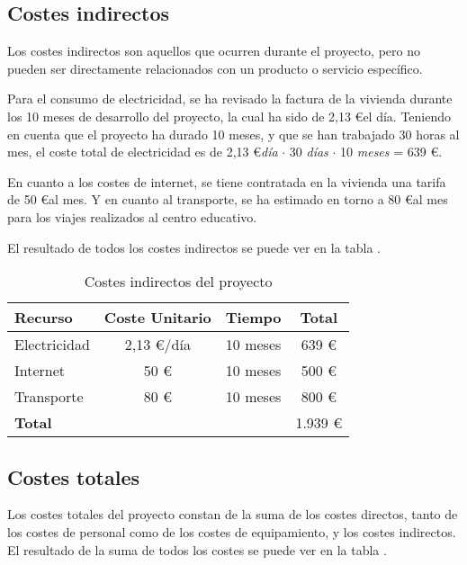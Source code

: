 \subsection{Costes indirectos}\label{subsec:costes_indirectos}
Los costes indirectos son aquellos que ocurren durante el proyecto, pero no pueden ser directamente relacionados con un producto o servicio específico.

Para el consumo de electricidad, se ha revisado la factura de la vivienda durante los 10 meses de desarrollo del proyecto, la cual ha sido de 2,13 \euro el día. Teniendo en cuenta que el proyecto ha durado 10 meses, y que se han trabajado 30 horas al mes, el coste total de electricidad es de 2,13 \euro \textit{día} $\cdot$ 30 \textit{días} $\cdot$ 10 \textit{meses} = 639 \euro. 

En cuanto a los costes de internet, se tiene contratada en la vivienda una tarifa de 50 \euro al mes. Y en cuanto al transporte, se ha estimado en torno a 80 \euro al mes para los viajes realizados al centro educativo.

El resultado de todos los costes indirectos se puede ver en la tabla .

\begin{table}[htbp]
    \centering
    \caption{Costes indirectos del proyecto}
    \label{tab:costes_indirectos}
    
    \begin{tabular}{@{}lccc@{}}
    \toprule
    Recurso        & Coste Unitario & Tiempo   & \textbf{Total} \\ \midrule
    Electricidad   & 2,13 \euro/día      & 10 meses & 639 \euro           \\
    Internet       & 50 \euro            & 10 meses & 500 \euro           \\
    Transporte     & 80 \euro            & 10 meses & 800 \euro           \\ \midrule
    \textbf{Total} &                &          & 1.939 \euro         \\ \bottomrule
    \end{tabular}
    \end{table}

\subsection{Costes totales}\label{subsec:costes_totales}

Los costes totales del proyecto constan de la suma de los costes directos, tanto de los costes de personal como de los costes de equipamiento, y los costes indirectos. El resultado de la suma de todos los costes se puede ver en la tabla .

